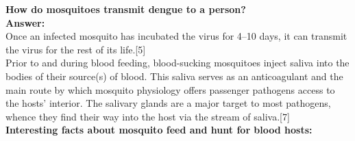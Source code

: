 \documentclass[11pt]{exam}
\begin{document}
\begin{questions}

\question
\label{5. Dengue transmission }
\textbf{How do mosquitoes transmit dengue to a person?}\\
\textbf{Answer:}\\
Once an infected mosquito has incubated the virus for 4–10 days, it can transmit the virus for
the rest of its life.[5] \\ 
Prior to and during blood feeding, blood-sucking mosquitoes inject saliva into the bodies of their source(s) of blood. This saliva serves as an anticoagulant %
and the main route by which mosquito physiology offers passenger pathogens access to the hosts' interior. The salivary glands are a major target to most pathogens, whence they find their way into the host via the stream of saliva.[7] \\ 

\textbf{Interesting facts about mosquito feed and hunt for blood hosts:} \\ 


\end{questions}
\end{document}
